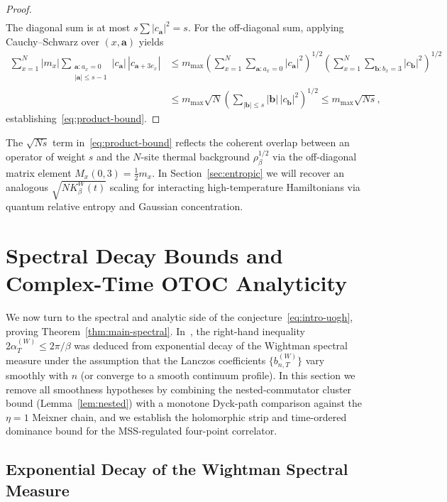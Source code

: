 \documentclass[11pt,a4paper]{article}
\numberwithin{equation}{section}
\theoremstyle{plain}
\theoremstyle{definition}
\begin{document}
\begin{proof}
\begin{align*}
\end{align*}
The diagonal sum is at most $s\sum |c_{\mathbf{a}}|^2 = s$. For the off-diagonal sum, applying Cauchy--Schwarz over $(x,\mathbf{a})$ yields
\begin{align*}
  \sum_{x=1}^N |m_x|\sum_{\substack{\mathbf{a}: a_x=0 \\ |\mathbf{a}|\le s-1}} |c_{\mathbf{a}}|\,|c_{\mathbf{a}+3e_x}|
  &\le m_{\max}\left(\sum_{x=1}^N\sum_{\mathbf{a}:a_x=0}|c_{\mathbf{a}}|^2\right)^{1/2}
    \left(\sum_{x=1}^N\sum_{\mathbf{b}:b_x=3}|c_{\mathbf{b}}|^2\right)^{1/2} \\
  &\le m_{\max}\sqrt{N}\left(\sum_{|\mathbf{b}|\le s}|\mathbf{b}|\,|c_{\mathbf{b}}|^2\right)^{1/2}
  \le m_{\max}\sqrt{Ns},
\end{align*}
establishing~\eqref{eq:product-bound}.
\end{proof}

The $\sqrt{Ns}$ term in~\eqref{eq:product-bound} reflects the coherent overlap between an operator of weight $s$ and the $N$-site thermal background $\rho_\beta^{1/2}$ via the off-diagonal matrix element $M_x(0,3) = \frac{1}{2}m_x$. In Section~\ref{sec:entropic} we will recover an analogous $\sqrt{N K_\beta^W(t)}$ scaling for interacting high-temperature Hamiltonians via quantum relative entropy and Gaussian concentration.

\section{Spectral Decay Bounds and Complex-Time OTOC Analyticity}\label{sec:spectral}

We now turn to the spectral and analytic side of the conjecture~\eqref{eq:intro-uogh}, proving Theorem~\ref{thm:main-spectral}. In~\cite{Parker2019,Avdoshkin2020}, the right-hand inequality $2\alpha_T^{(W)} \le 2\pi/\beta$ was deduced from exponential decay of the Wightman spectral measure under the assumption that the Lanczos coefficients $\{b_{n,T}^{(W)}\}$ vary smoothly with $n$ (or converge to a smooth continuum profile). In this section we remove all smoothness hypotheses by combining the nested-commutator cluster bound (Lemma~\ref{lem:nested}) with a monotone Dyck-path comparison against the $\eta=1$ Meixner chain, and we establish the holomorphic strip and time-ordered dominance bound for the MSS-regulated four-point correlator.

\subsection{Exponential Decay of the Wightman Spectral Measure}\label{subsec:spectral-measure}
\end{document}
